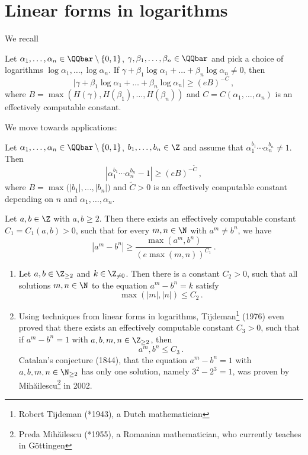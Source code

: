 \section{Linear forms in logarithms}

We recall
\begin{thm}[Baker, 1975]
	Let \( \alpha_1, \dotsc, \alpha_n \in \QQbar \setminus \{0,1\} \), \( \gamma, \beta_1, \dotsc, \beta_n \in \QQbar \) and pick a choice of logarithms \( \log\alpha_1, \dotsc, \log\alpha_n \).
	If \( \gamma + \beta_1 \log\alpha_1 + \dots + \beta_n \log\alpha_n \neq 0 \), then
	\[ \big| \gamma + \beta_1 \log\alpha_1 + \dots + \beta_n \log\alpha_n \big| \geq (eB)^{-C} \,, \]
	where \( B = \max(H(\gamma), H(\beta_1), \dotsc, H(\beta_n)) \) and \( C = C(\alpha_1, \dotsc, \alpha_n) \) is an effectively computable constant.
\end{thm}

We move towards applications:

\begin{cor}
	Let \( \alpha_1, \dotsc, \alpha_n \in \QQbar \setminus \{0,1\} \), \( b_1, \dotsc, b_n \in \Z \) and assume that \( \alpha_1^{b_1} \dotsm \alpha_n^{b_n} \neq 1 \).
	Then
	\[ \left| \alpha_1^{b_1} \dotsm \alpha_n^{b_n} - 1 \right| \geq (eB)^{-\tilde{C}} \,, \]
	where \( B = \max \big( |b_1|, \dotsc, |b_n| \big) \) and \( \tilde{C} > 0 \) is an effectively computable constant depending on \( n \) and \( \alpha_1, \dotsc, \alpha_n \).
\end{cor}

\begin{cor}
	Let \( a,b \in \Z \) with \( a,b \geq 2 \).
	Then there exists an effectively computable constant \( C_1 = C_1(a,b) > 0 \), such that for every \( m,n \in \N \) with \( a^m \neq b^n \), we have
	\[ \left| a^m-b^n \right| \geq \frac{\max(a^m,b^n)}{(e\max(m,n))^{C_1}} \,. \]
\end{cor}

\begin{rem*}
	\begin{enumerate}[label=\alph*)]
		\item Let \( a,b \in \Z_{\geq 2} \) and \( k \in \Z_{\neq 0} \).
			Then there is a constant \( C_2 > 0 \), such that all solutions \( m,n \in \N \) to the equation \( a^m - b^n = k \) satisfy
			\[ \max(|m|,|n|) \leq C_2 \,. \] 
		\item Using techniques from linear forms in logarithms, Tijdeman\footnote{Robert Tijdeman (*1943), a Dutch mathematician} (1976) even proved that there exists an effectively computable constant \( C_3 > 0 \), such that if \( a^m - b^n = 1 \) with \( a,b,m,n \in \Z_{\geq 2} \), then
			\[ a^m, b^n \leq C_3 \,. \]
			Catalan's conjecture (1844), that the equation \( a^m-b^n = 1 \) with \( a,b,m,n \in \N_{\geq 2} \) has only one solution, namely \( 3^2-2^3 = 1 \), was proven by Mihăilescu\footnote{Preda Mihăilescu (*1955), a Romanian mathematician, who currently teaches in Göttingen} in 2002.
	\end{enumerate}
\end{rem*}

